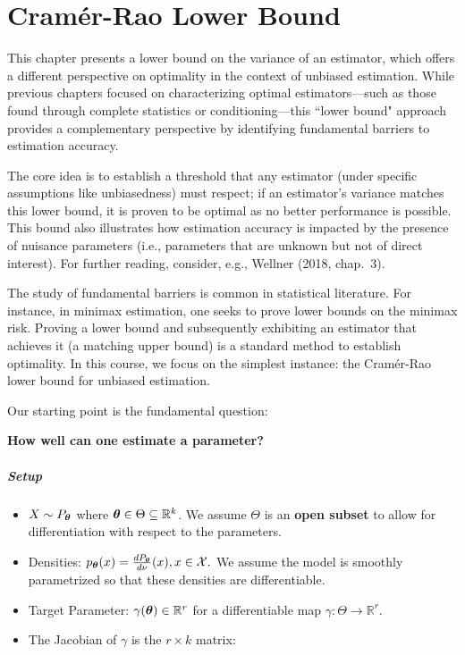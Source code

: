 \chapter{Cram\'er-Rao Lower Bound}
\label{cha:crlb}

This chapter presents a lower bound on the variance of an estimator, which offers a different perspective on optimality in the context of unbiased estimation. While previous chapters focused on characterizing optimal estimators—such as those found through complete statistics or conditioning—this ``lower bound" approach provides a complementary perspective by identifying fundamental barriers to estimation accuracy. 

The core idea is to establish a threshold that any estimator (under specific assumptions like unbiasedness) must respect; if an estimator's variance matches this lower bound, it is proven to be optimal as no better performance is possible. This bound also illustrates how estimation accuracy is impacted by the presence of nuisance parameters (i.e., parameters that are unknown but not of direct interest). For further reading, consider, e.g., Wellner (2018, chap.~3).

\begin{remark}
    The study of fundamental barriers is common in statistical literature. For instance, in minimax estimation, one seeks to prove lower bounds on the minimax risk. Proving a lower bound and subsequently exhibiting an estimator that achieves it (a matching upper bound) is a standard method to establish optimality. In this course, we focus on the simplest instance: the Cram\'er-Rao lower bound for unbiased estimation.
\end{remark}

Our starting point is the fundamental question:

\textbf{How well can one estimate a parameter?}

\paragraph{Setup}%
\label{par:Setup}
\begin{itemize}
    \item 
        \(X \sim P_{\boldsymbol{\theta}}\) where \(\boldsymbol{\theta} \in \Theta \subseteq \mathbb{R}^k\). We assume \(\Theta\) is an \textbf{open subset} to allow for differentiation with respect to the parameters.
    \item 
        Densities: 
        \(p_{\boldsymbol{\theta}}(x) = \frac{dP_{\boldsymbol{\theta}}}{d \nu}(x), x \in \mathcal{X}.\) 
        We assume the model is smoothly parametrized so that these densities are differentiable.
    \item 
        Target Parameter: \(\gamma(\boldsymbol{\theta}) \in \mathbb{R}^r\) for a differentiable map \(\gamma: \Theta \to \mathbb{R}^r\).
    \item 
        The Jacobian of \(\gamma\) is the \(r \times k\) matrix:
\end{itemize}

